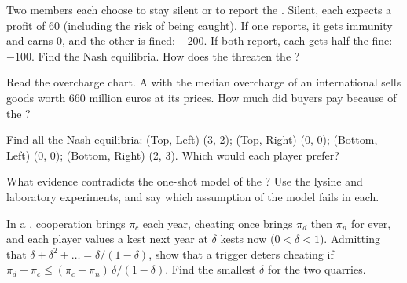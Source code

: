 \begin{exercise}[$\star\star$]\label{exo:g11:oligopoly-and-games:9}
Two  members each choose to stay silent or to report the . Silent, each expects a profit of 60 (including the risk of being caught). If one reports, it gets
immunity and earns 0, and the other is fined: $-200$. If both report, each gets half the fine: $-100$. Find the Nash equilibria. How does the  threaten
the ?
\end{exercise}

\begin{exercise}[$\star\star$]\label{exo:g11:oligopoly-and-games:10}
Read the overcharge chart. A  with the median overcharge of an international  sells goods worth 660 million euros at its prices. How much did buyers pay
because of the ?
\end{exercise}

\begin{exercise}[$\star\star$]\label{exo:g11:oligopoly-and-games:11}
Find all the Nash equilibria: (Top, Left) (3, 2); (Top, Right) (0, 0); (Bottom, Left) (0, 0); (Bottom, Right) (2, 3). Which would each player prefer?
\end{exercise}

\begin{exercise}[$\star\star\star$]\label{exo:g11:oligopoly-and-games:12}
What evidence contradicts the one-shot model of the ? Use the lysine  and laboratory experiments, and say which assumption of the model fails in each.
\end{exercise}

\begin{exercise}[$\star\star\star$]\label{exo:g11:oligopoly-and-games:13}
In a , cooperation brings $\pi_c$ each year, cheating once brings $\pi_d$ then $\pi_n$ for ever, and each player values a kest next year at $\delta$ kests now
($0 < \delta < 1$). Admitting that $\delta + \delta^2 + \dots = \delta/(1 - \delta)$, show that a trigger  deters cheating if $\pi_d - \pi_c \leq (\pi_c - \pi_n)\,\delta/(1 -
\delta)$. Find the smallest $\delta$ for the two quarries.
\end{exercise}


